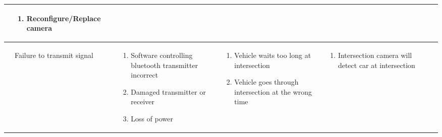 \documentclass [10pt]{article}
\begin{document}
{{\begin{minipage}{\textwidth}
\begin{longtable}{ |p{ }  | p{ } |  p{ } |  p{ } | p{ } | p{ } |  p{ }|}
    
    & \cellcolor{tableCell}\begin{minipage}{.24 \columnwidth} 
                \vspace{2mm}
                \begin{enumerate}
                    \item Reconfigure/Replace camera \vspace {1mm}
                \end{enumerate}
        \end{minipage} \\ \hline
        
        
    \cellcolor{subsectionC}
    &  \begin{minipage} {.19\columnwidth}
            \begin{center} Failure to transmit signal \end{center}
        \end{minipage} 
    & \begin{minipage}{.22\textwidth} 
    
    \vspace {1mm}
                \begin{enumerate}
                    \item Software controlling bluetooth transmitter incorrect
                    \item Damaged transmitter or receiver 
                    \item Loss of power\vspace {1mm}
                \end{enumerate}
        \end{minipage}
    & \begin{minipage}{.22\textwidth} 
                \vspace{2mm}
                \begin{enumerate}
                    \item Vehicle waits too long at intersection
                    \item Vehicle goes through intersection at the wrong time\vspace {1mm}
                \end{enumerate}
        \end{minipage}
    & \begin{minipage}{.18\textwidth} 
                \begin{enumerate}
                    \item Intersection camera will detect car at intersection \vspace {1mm}
                \end{enumerate}
        \end{minipage}
    & 
    

\end{longtable}
\end{minipage}}}
\end{document}
